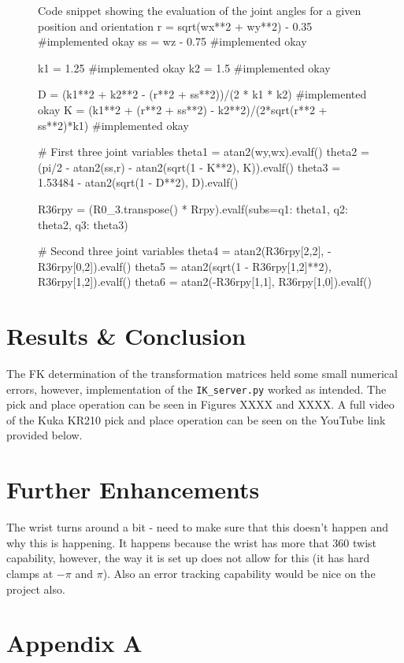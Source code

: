 \documentclass[a4paper]{article}
\begin{document}
\begin{figure}[h]\footnotesize
	\begin{sexylisting}{Code snippet showing the evaluation of the joint angles for a given position and orientation}
r = sqrt(wx**2 + wy**2) - 0.35 #implemented okay
ss = wz - 0.75 #implemented okay

k1 = 1.25 #implemented okay
k2 = 1.5 #implemented okay

D = (k1**2 + k2**2 - (r**2 + ss**2))/(2 * k1 * k2) #implemented okay
K = (k1**2 + (r**2 + ss**2) - k2**2)/(2*sqrt(r**2 + ss**2)*k1) #implemented okay

# First three joint variables
theta1 = atan2(wy,wx).evalf()
theta2 = (pi/2 - atan2(ss,r) - atan2(sqrt(1 - K**2), K)).evalf()
theta3 = 1.53484 - atan2(sqrt(1 - D**2), D).evalf()

R36rpy = (R0_3.transpose() * Rrpy).evalf(subs={q1: theta1, q2: theta2, q3: theta3})

# Second three joint variables
theta4 = atan2(R36rpy[2,2], -R36rpy[0,2]).evalf()
theta5 = atan2(sqrt(1 - R36rpy[1,2]**2), R36rpy[1,2]).evalf()
theta6 = atan2(-R36rpy[1,1], R36rpy[1,0]).evalf()
	\end{sexylisting}
\end{figure}

\newpage

\section{Results \& Conclusion}
The FK determination of the transformation matrices held some small numerical errors, however, implementation of the \verb|IK_server.py| worked as intended. The pick and place operation can be seen in Figures XXXX and XXXX. A full video of the Kuka KR210 pick and place operation can be seen on the YouTube link provided below.



\section{Further Enhancements}
The wrist turns around a bit - need to make sure that this doesn't happen and why this is happening. It happens because the wrist has more that 360 twist capability, however, the way it is set up does not allow for this (it has hard clamps at $-\pi$ and $\pi$). Also an error tracking capability would be nice on the project also.

\section{Appendix A}

\lstset{
	frame=single,
	basicstyle=\ttfamily,
	numbers=left,
	showstringspaces=false,
}

\tiny

\end{document}
